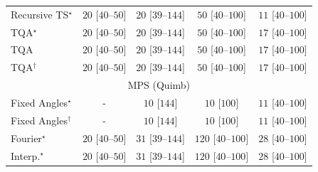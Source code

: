 \begin{tabular}{l|cccc|}
Recursive TS$^\star$ & {\cellcolor[HTML]{F5FBF2}} \color[HTML]{000000} $20$ [$40$--$50$] & {\cellcolor[HTML]{F5FBF2}} \color[HTML]{000000} $20$ [$39$--$144$] & {\cellcolor[HTML]{EFF9EC}} \color[HTML]{000000} $50$ [$40$--$100$] & {\cellcolor[HTML]{F6FCF4}} \color[HTML]{000000} $11$ [$40$--$100$] \\
TQA$^\star$ & {\cellcolor[HTML]{F5FBF2}} \color[HTML]{000000} $20$ [$40$--$50$] & {\cellcolor[HTML]{F5FBF2}} \color[HTML]{000000} $20$ [$39$--$144$] & {\cellcolor[HTML]{EFF9EC}} \color[HTML]{000000} $50$ [$40$--$100$] & {\cellcolor[HTML]{F5FBF3}} \color[HTML]{000000} $17$ [$40$--$100$] \\
TQA & {\cellcolor[HTML]{F5FBF2}} \color[HTML]{000000} $20$ [$40$--$50$] & {\cellcolor[HTML]{F5FBF2}} \color[HTML]{000000} $20$ [$39$--$144$] & {\cellcolor[HTML]{EFF9EC}} \color[HTML]{000000} $50$ [$40$--$100$] & {\cellcolor[HTML]{F5FBF3}} \color[HTML]{000000} $17$ [$40$--$100$] \\
TQA$^\dagger$ & {\cellcolor[HTML]{F5FBF2}} \color[HTML]{000000} $20$ [$40$--$50$] & {\cellcolor[HTML]{F5FBF2}} \color[HTML]{000000} $20$ [$39$--$144$] & {\cellcolor[HTML]{EFF9EC}} \color[HTML]{000000} $50$ [$40$--$100$] & {\cellcolor[HTML]{F5FBF3}} \color[HTML]{000000} $17$ [$40$--$100$] \\
\cline{1-5}
\multicolumn{5}{c}{\rule{0pt}{8pt}MPS (Quimb)} \\
\midrule
Fixed Angles$^\star$ & {\cellcolor[HTML]{000000}} \color[HTML]{F1F1F1} {\cellcolor{white}} \color{black} - & {\cellcolor[HTML]{F7FCF5}} \color[HTML]{000000} $10$ [$144$] & {\cellcolor[HTML]{F7FCF5}} \color[HTML]{000000} $10$ [$100$] & {\cellcolor[HTML]{F6FCF4}} \color[HTML]{000000} $11$ [$40$--$100$] \\
Fixed Angles$^\dagger$ & {\cellcolor[HTML]{000000}} \color[HTML]{F1F1F1} {\cellcolor{white}} \color{black} - & {\cellcolor[HTML]{F7FCF5}} \color[HTML]{000000} $10$ [$144$] & {\cellcolor[HTML]{F7FCF5}} \color[HTML]{000000} $10$ [$100$] & {\cellcolor[HTML]{F6FCF4}} \color[HTML]{000000} $11$ [$40$--$100$] \\
Fourier$^\star$ & {\cellcolor[HTML]{F5FBF2}} \color[HTML]{000000} $20$ [$40$--$50$] & {\cellcolor[HTML]{F3FAF0}} \color[HTML]{000000} $31$ [$39$--$144$] & {\cellcolor[HTML]{E0F3DB}} \color[HTML]{000000} $120$ [$40$--$100$] & {\cellcolor[HTML]{F4FBF1}} \color[HTML]{000000} $28$ [$40$--$100$] \\
Interp.$^\star$ & {\cellcolor[HTML]{F5FBF2}} \color[HTML]{000000} $20$ [$40$--$50$] & {\cellcolor[HTML]{F3FAF0}} \color[HTML]{000000} $31$ [$39$--$144$] & {\cellcolor[HTML]{E0F3DB}} \color[HTML]{000000} $120$ [$40$--$100$] & {\cellcolor[HTML]{F4FBF1}} \color[HTML]{000000} $28$ [$40$--$100$] \\

\end{tabular}
